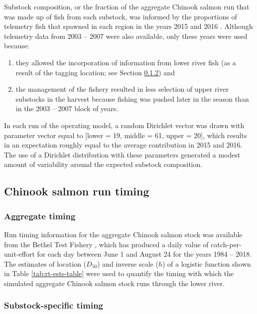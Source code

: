 \documentclass[12pt,]{book}
\theoremstyle{definition}
\theoremstyle{definition}
\theoremstyle{definition}
\theoremstyle{remark}
\begin{document}
\noindent
Substock composition, or the fraction of the aggregate Chinook salmon
run that was made up of fish from each substock, was informed by the
proportions of telemetry fish that spawned in each region in the years
2015 and 2016 \citep{smith-liller-2017a, smith-liller-2017b}. Although
telemetry data from 2003 -- 2007 were also available, only these years
were used because:

\begin{enumerate}
\def\labelenumi{(\arabic{enumi})}
\item
  they allowed the incorporation of information from lower river fish
  (as a result of the tagging location; see Section
  \ref{mse-data-ss-timing}) and
\item
  the management of the fishery resulted in less selection of upper
  river substocks in the harvest because fishing was pushed later in the
  season than in the 2003 -- 2007 block of years.
\end{enumerate}

\noindent
In each run of the operating model, a random Dirichlet vector was drawn
with parameter vector equal to {[}lower = 19, middle = 61, upper =
20{]}, which results in an expectation roughly equal to the average
contribution in 2015 and 2016. The use of a Dirichlet distribution with
these parameters generated a modest amount of variability around the
expected substock composition.

\subsection{Chinook salmon run timing}\label{chinook-salmon-run-timing}

\subsubsection{Aggregate timing}\label{aggregate-timing}

\noindent
Run timing information for the aggregate Chinook salmon stock was
available from the Bethel Test Fishery \citep{bue-lipka-2016}, which has
produced a daily value of catch-per-unit-effort for each day between
June 1 and August 24 for the years 1984 -- 2018. The estimates of
location (\(D_{50}\)) and inverse scale (\(h\)) of a logistic function
shown in Table \ref{tab:rt-ests-table} were used to quantify the timing
with which the simulated aggregate Chinook salmon stock runs through the
lower river.

\subsubsection{Substock-specific timing}\label{mse-data-ss-timing}
\end{document}
